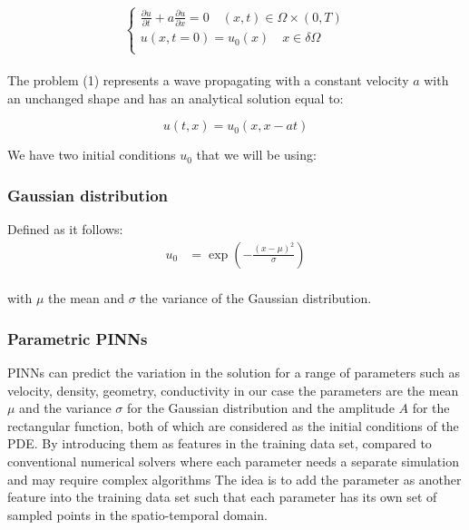 \documentclass{article}
\begin{document}
\begin{equation}
    \begin{cases}
    \frac{\partial u}{\partial t} + a \frac{\partial u}{\partial x} = 0 \quad (x,t) \in \Omega \times (0,T) \\
     u(x,t=0) = u_0(x) \quad x \in \delta \Omega \\
    \end{cases}
\end{equation}
\\
The problem (1) represents a wave propagating with a constant velocity $a$ with an unchanged shape and has an analytical solution equal to: 

$$
u(t, x)=u_0(x, x-at)
$$

We have two initial conditions $u_0$ that we will be using:  
\subsubsection*{Gaussian distribution}

Defined as it follows:
\begin{align*}
    u_0 &= \exp\left(-\frac{(x - \mu)^2}{\sigma}\right)
\end{align*}
\\
with $\mu$ the mean and $\sigma$ the variance of the Gaussian distribution.



\subsubsection{Parametric PINNs}

PINNs can predict the variation in the solution for a range of parameters such as velocity, density, geometry, conductivity in our case the parameters are the mean $\mu$ and the variance $\sigma$ for the Gaussian distribution and the amplitude $A$ for the rectangular function, both of which are considered as the initial conditions of the PDE.
By introducing them as features in the training data set, compared to conventional numerical solvers where each parameter needs a separate simulation and may require complex algorithms The idea is to add the parameter as another feature into the training data set such that each parameter has its own set of sampled points in the spatio-temporal domain.
\end{document}
